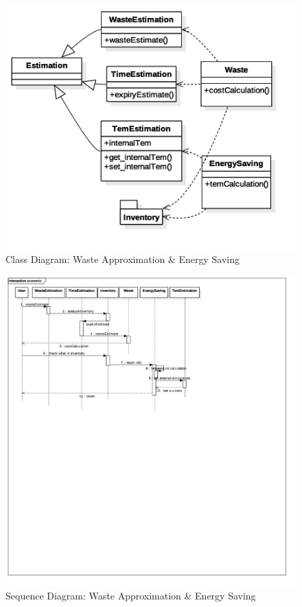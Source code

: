 		\begin{figure}[p]
			\centering
			\includegraphics[width=\textwidth]{ClassDiag-Eco.png}
			\caption{Class Diagram: Waste Approximation \& Energy Saving}
		\end{figure}
		\begin{figure}[p]
			\centering
			\includegraphics[width=\textwidth]{eco_sequence_conomic_3.png}
			\caption{Sequence Diagram: Waste Approximation \& Energy Saving}
		\end{figure}






